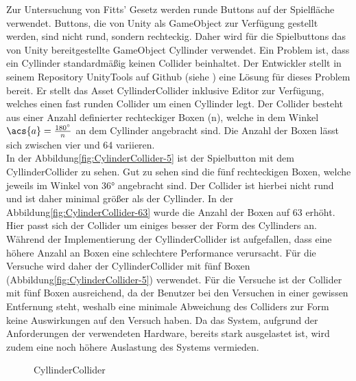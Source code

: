 Zur Untersuchung von Fitts' Gesetz werden runde Buttons auf der Spielfläche verwendet. Buttons, die von Unity als GameObject zur Verfügung gestellt werden, sind nicht rund, sondern rechteckig. Daher wird für die Spielbuttons das von Unity bereitgestellte GameObject {\ttfamily Cyllinder} verwendet. Ein Problem ist, dass ein Cyllinder standardmäßig keinen Collider beinhaltet. Der Entwickler \citeauthor{kode80.2016} stellt in seinem Repository UnityTools auf Github (siehe \cite{kode80.2016}) eine Lösung für dieses Problem bereit. Er stellt das Asset {\ttfamily CyllinderCollider} inklusive Editor zur Verfügung, welches einen fast runden Collider um einen Cyllinder legt. Der Collider besteht aus einer Anzahl definierter rechteckiger Boxen (n), welche in dem Winkel $\acs{a} = \frac{180^\circ}{n}$ an dem Cyllinder angebracht sind. Die Anzahl der Boxen lässt sich zwischen vier und 64 variieren.\\
In der Abbildung\autoref{fig:CylinderCollider-5} ist der Spielbutton mit dem CyllinderCollider zu sehen. Gut zu sehen sind die fünf rechteckigen Boxen, welche jeweils im Winkel von 36° angebracht sind. Der Collider ist hierbei nicht rund und ist daher minimal größer als der Cyllinder. In der Abbildung\autoref{fig:CylinderCollider-63} wurde die Anzahl der Boxen auf 63 erhöht. Hier passt sich der Collider um einiges besser der Form des Cyllinders an. Während der Implementierung der CyllinderCollider ist aufgefallen, dass eine höhere Anzahl an Boxen eine schlechtere Performance verursacht. Für die Versuche wird daher der CyllinderCollider mit fünf Boxen (Abbildung\autoref{fig:CylinderCollider-5}) verwendet. Für die Versuche ist der Collider mit fünf Boxen ausreichend, da der Benutzer bei den Versuchen in einer gewissen Entfernung steht, weshalb eine minimale Abweichung des Colliders zur Form keine Auswirkungen auf den Versuch haben. Da das System, aufgrund der Anforderungen der verwendeten Hardware, bereits stark ausgelastet ist, wird zudem eine noch höhere Auslastung des Systems vermieden.

\begin{figure}[!htbp]
	\centering
	\qquad      
	\caption{CyllinderCollider}
	\label{fig:CylinderCollider}
\end{figure}  


